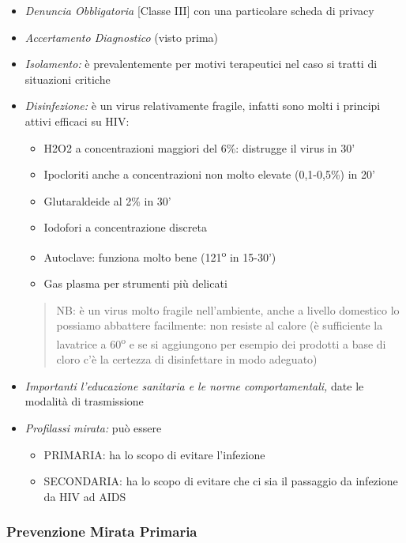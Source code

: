 \begin{itemize}
\item
  \emph{Denuncia Obbligatoria} {[}Classe III{]} con una particolare
  scheda di privacy
\item
  \emph{Accertamento Diagnostico} (visto prima)
\item
  \emph{Isolamento:} è prevalentemente per motivi terapeutici nel caso
  si tratti di situazioni critiche
\item
  \emph{Disinfezione:} è un virus relativamente fragile, infatti sono
  molti i principi attivi efficaci su HIV:

  \begin{itemize}
  \item
    H2O2 a concentrazioni maggiori del 6\%: distrugge il virus in 30'
  \item
    Ipocloriti anche a concentrazioni non molto elevate (0,1-0,5\%) in
    20'
  \item
    Glutaraldeide al 2\% in 30'
  \item
    Iodofori a concentrazione discreta
  \item
    Autoclave: funziona molto bene (121\textsuperscript{o} in 15-30')
  \item
    Gas plasma per strumenti più delicati
  \end{itemize}

\begin{quote}
NB: è un virus molto fragile nell'ambiente, anche a livello domestico lo
possiamo abbattere facilmente: non resiste al calore (è sufficiente la
lavatrice a 60\textsuperscript{o} e se si aggiungono per esempio dei prodotti a base di
cloro c'è la certezza di disinfettare in modo adeguato)
\end{quote}

\item
  \emph{Importanti l'educazione sanitaria e le norme comportamentali,}
  date le modalità di trasmissione
\item
  \emph{Profilassi mirata:} può essere

  \begin{itemize}
  \item
    PRIMARIA: ha lo scopo di evitare l'infezione
  \item
    SECONDARIA: ha lo scopo di evitare che ci sia il passaggio da
    infezione da HIV ad AIDS
  \end{itemize}
\end{itemize}

\subsubsection{Prevenzione Mirata Primaria}

